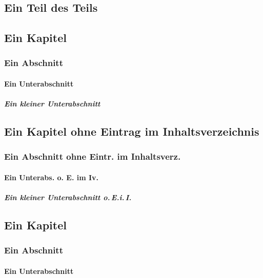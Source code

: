 \begin{lfgwcode}{}
 
 \part{Ein Teil des Teils}
 \chapter{Ein Kapitel}
 \section{Ein Abschnitt}
 \subsection{Ein Unterabschnitt}
 \subsubsection{Ein kleiner Unterabschnitt}
 
 \chapter*{Ein Kapitel ohne Eintrag im Inhaltsverzeichnis}
 \section*{Ein Abschnitt ohne Eintr. im Inhaltsverz.}
 \subsection*{Ein Unterabs. o. E. im Iv.}
 \subsubsection*{Ein kleiner Unterabschnitt o.\,E.i.\,I.}
 
 \chapter[Kurzfssg. f. d. Kolumnentitel]{Ein Kapitel}
 \section[Kurzfssg. f. d. Kolumnentitel]{Ein Abschnitt}
 \subsection[Kurzfssg. f. d. Kolumnentitel]{Ein Unterabschnitt}
 
 
\end{lfgwcode}

